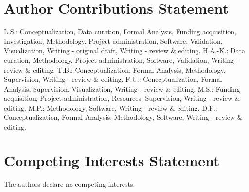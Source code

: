 \documentclass[5p,numafflabel]{elsarticle}
\begin{document}
\section*{Author Contributions Statement}



L.S.:
Conceptualization,
Data curation,
Formal Analysis,
Funding acquisition,
Investigation,
Methodology,
Project administration,
Software,
Validation,
Visualization,
Writing - original draft,
Writing - review \& editing.
H.A.-K.:
Data curation,
Methodology,
Project administration,
Software,
Validation,
Writing - review \& editing.
T.B.:
Conceptualization,
Formal Analysis,
Methodology,
Supervision,
Writing - review \& editing.
F.U.:
Conceptualization,
Formal Analysis,
Supervision,
Visualization,
Writing - review \& editing.
M.S.:
Funding acquisition,
Project administration,
Resources,
Supervision,
Writing - review \& editing.
M.P.:
Methodology,
Software,
Writing - review \& editing.
D.F.:
Conceptualization,
Formal Analysis,
Methodology,
Software,
Writing - review \& editing.


\section*{Competing Interests Statement}

The authors declare no competing interests.
\end{document}
